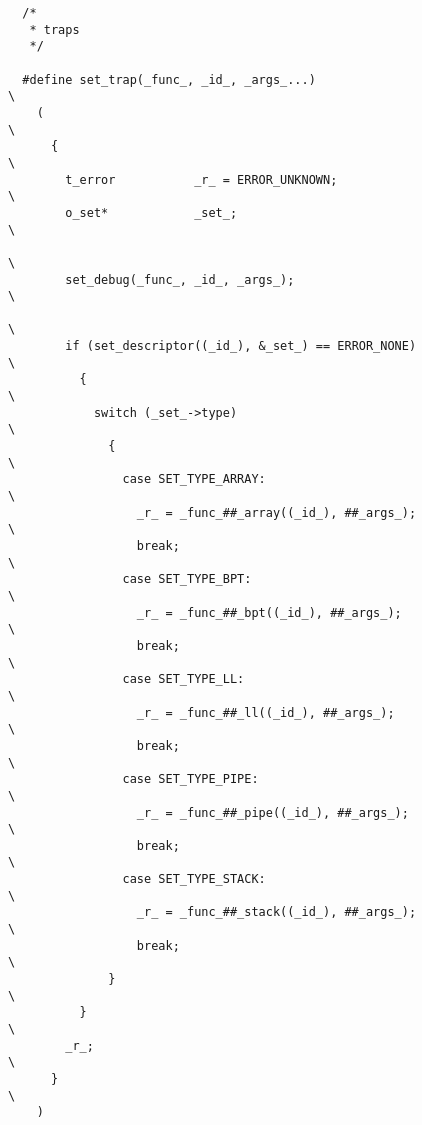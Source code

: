 \begin{verbatim}
  /*
   * traps
   */

  #define set_trap(_func_, _id_, _args_...)                               \
    (                                                                     \
      {                                                                   \
        t_error           _r_ = ERROR_UNKNOWN;                            \
        o_set*            _set_;                                          \
                                                                          \
        set_debug(_func_, _id_, _args_);                                  \
                                                                          \
        if (set_descriptor((_id_), &_set_) == ERROR_NONE)                 \
          {                                                               \
            switch (_set_->type)                                          \
              {                                                           \
                case SET_TYPE_ARRAY:                                      \
                  _r_ = _func_##_array((_id_), ##_args_);                 \
                  break;                                                  \
                case SET_TYPE_BPT:                                        \
                  _r_ = _func_##_bpt((_id_), ##_args_);                   \
                  break;                                                  \
                case SET_TYPE_LL:                                         \
                  _r_ = _func_##_ll((_id_), ##_args_);                    \
                  break;                                                  \
                case SET_TYPE_PIPE:                                       \
                  _r_ = _func_##_pipe((_id_), ##_args_);                  \
                  break;                                                  \
                case SET_TYPE_STACK:                                      \
                  _r_ = _func_##_stack((_id_), ##_args_);                 \
                  break;                                                  \
              }                                                           \
          }                                                               \
        _r_;                                                              \
      }                                                                   \
    )
\end{verbatim}


